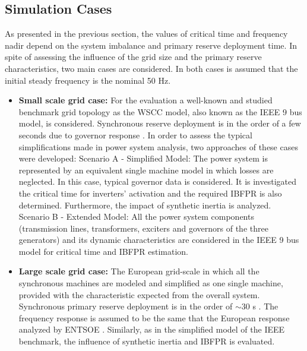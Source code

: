 \subsection{Simulation Cases}

As presented in the previous section, the values of critical time and frequency nadir depend on the system imbalance and primary reserve deployment time. In spite of assessing the influence of the grid size and the primary reserve characteristics, two main cases are considered. In both cases is assumed that the initial steady frequency is the nominal 50 Hz.


\begin{itemize}[leftmargin=*,labelsep=5.8mm]
\item \textbf{Small scale grid case:} For the evaluation a well-known and studied benchmark grid topology as the WSCC model, also known as the IEEE 9 bus model, is considered. Synchronous reserve deployment is in the order of a few seconds due to governor response \cite{kundur1994power, sundaram2008comparing}. In order to assess the typical simplifications made in power system analysis, two approaches of these cases were developed:
\subitem Scenario A - Simplified Model: The power system is represented by an equivalent single machine model in which losses are neglected. In this case, typical governor data is considered. It is investigated the critical time for inverters' activation and the required IBFPR is also determined. Furthermore, the impact of synthetic inertia is analyzed.
\subitem Scenario B - Extended Model: All the power system components (transmission lines, transformers, exciters and governors of the three generators) and its dynamic characteristics are considered in the IEEE 9 bus model for critical time and IBFPR estimation.\\
\item \textbf{Large scale grid case:} The European grid-scale in which all the synchronous machines are modeled and simplified as one single machine, provided with the characteristic expected from the overall system. Synchronous primary reserve deployment is in the order of $ \sim30 $ s \cite{ENTSOE.2016, hultholm2015optimal}. The frequency response is assumed to be the same that the European response analyzed by ENTSOE \cite{ENTSOE.2016}. Similarly, as in the simplified model of the IEEE benchmark, the influence of synthetic inertia and IBFPR is evaluated.
\end{itemize}

